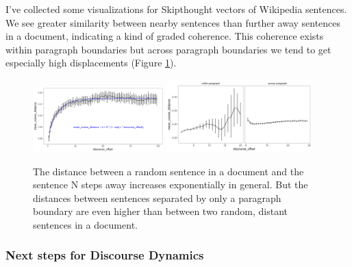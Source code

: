 \documentclass{article}
\begin{document}
   I've collected some visualizations for Skipthought vectors of Wikipedia sentences.
   We see greater similarity between nearby sentences than further away sentences in a document, indicating a kind of graded coherence.
   This coherence exists within paragraph boundaries but across paragraph boundaries we tend to get especially high displacements (Figure \ref{fig:dnd}).

   \begin{figure}[bht]
      \begin{center}
         \includegraphics[width=0.45\textwidth]{images/decay.png}
         \includegraphics[width=0.5\textwidth]{images/within-vs-across-paragraphs.png}
      \end{center}
      \caption{The distance between a random sentence in a document and the sentence N steps away increases exponentially in general. But the distances between sentences separated by only a paragraph boundary are even higher than between two random, distant sentences in a document.} 
      \label{fig:dnd}
   \end{figure}

   \subsubsection{Next steps for Discourse Dynamics}
\end{document}
